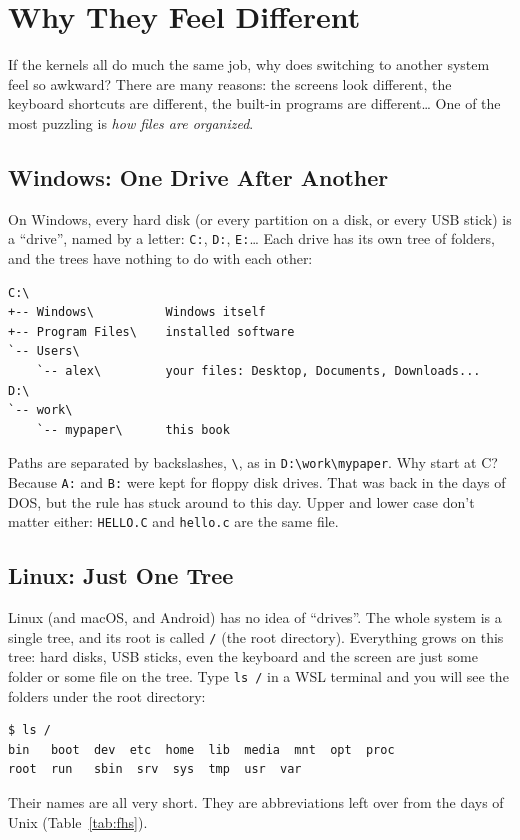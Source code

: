 \section{Why They Feel Different}

If the kernels all do much the same job, why does switching to another system feel so awkward? There are many reasons: the screens look different, the keyboard shortcuts are different, the built-in programs are different\ldots{} One of the most puzzling is \emph{how files are organized}.

\subsection{Windows: One Drive After Another}

On Windows, every hard disk (or every partition on a disk, or every USB stick) is a ``drive'', named by a letter: \texttt{C:}, \texttt{D:}, \texttt{E:}\ldots{} Each drive has its own tree of folders, and the trees have nothing to do with each other:
\begin{verbatim}
C:\
+-- Windows\          Windows itself
+-- Program Files\    installed software
`-- Users\
    `-- alex\         your files: Desktop, Documents, Downloads...
D:\
`-- work\
    `-- mypaper\      this book
\end{verbatim}
Paths are separated by backslashes, \texttt{\textbackslash}, as in \texttt{D:\textbackslash work\textbackslash mypaper}. Why start at C? Because \texttt{A:} and \texttt{B:} were kept for floppy disk drives. That was back in the days of DOS, but the rule has stuck around to this day. Upper and lower case don't matter either: \texttt{HELLO.C} and \texttt{hello.c} are the same file.

\subsection{Linux: Just One Tree}

Linux (and macOS, and Android) has no idea of ``drives''. The whole system is a single tree, and its root is called \texttt{/} (the root directory). Everything grows on this tree: hard disks, USB sticks, even the keyboard and the screen are just some folder or some file on the tree. Type \texttt{ls /} in a WSL terminal and you will see the folders under the root directory:
\begin{verbatim}
$ ls /
bin   boot  dev  etc  home  lib  media  mnt  opt  proc
root  run   sbin  srv  sys  tmp  usr  var
\end{verbatim}
Their names are all very short. They are abbreviations left over from the days of Unix (Table~\ref{tab:fhs}).


